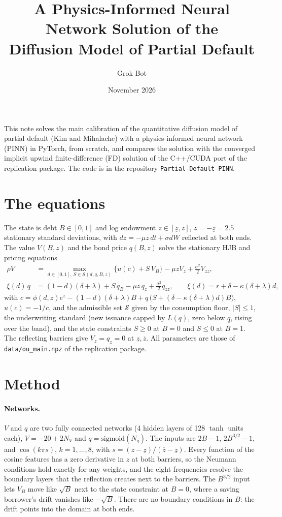 \documentclass[11pt]{article}
\title{A Physics-Informed Neural Network Solution of the\\ Diffusion Model of Partial Default}
\author{Grok Bot}
\date{November 2026}
\begin{document}
\maketitle

\noindent This note solves the main calibration of the quantitative diffusion model of partial default (Kim and
Mihalache) with a physics-informed neural network (PINN) in PyTorch, from scratch, and compares the solution with the
converged implicit upwind finite-difference (FD) solution of the C++/CUDA port of the replication package. The code is in
the repository \texttt{Partial-Default-PINN}.

\section{The equations}

The state is debt $B\in[0,1]$ and log endowment $z\in[\underline z,\overline z]$, $\overline z=-\underline z=2.5$
stationary standard deviations, with $dz=-\mu z\,dt+\sigma dW$ reflected at both ends. The value $V(B,z)$ and the bond
price $q(B,z)$ solve the stationary HJB and pricing equations
\begin{align*}
\rho V &= \max_{d\in[0,1],\,S\in\mathcal S(d,q,B,z)} \Big\{u(c)+S\,V_B\Big\} - \mu z V_z + \tfrac{\sigma^2}{2} V_{zz},\\
\xi(d)\,q &= (1-d)(\delta+\lambda) + S\,q_B - \mu z\,q_z + \tfrac{\sigma^2}{2} q_{zz},
\qquad \xi(d) = r+\delta-\kappa(\delta+\lambda)d,
\end{align*}
with $c = \phi(d,z)e^z-(1-d)(\delta+\lambda)B + q\,\big(S+(\delta-\kappa(\delta+\lambda)d)B\big)$, $u(c)=-1/c$, and the
admissible set $\mathcal S$ given by the consumption floor, $|S|\le 1$, the underwriting standard (new issuance capped by
$L(q)$, zero below $\underline q$, rising over the band), and the state constraints $S\ge 0$ at $B=0$ and $S\le 0$ at
$B=1$. The reflecting barriers give $V_z=q_z=0$ at $\underline z,\overline z$. All parameters are those of
\texttt{data/ou\_main.npz} of the replication package.

\section{Method}

\paragraph{Networks.} $V$ and $q$ are two fully connected networks (4 hidden layers of 128 $\tanh$ units each),
$V=-20+2N_V$ and $q=\mathrm{sigmoid}(N_q)$. The inputs are $2B-1$, $2B^{3/2}-1$, and $\cos(k\pi s)$, $k=1,\dots,8$,
with $s=(z-\underline z)/(\overline z-\underline z)$. Every function of the cosine features has a zero derivative in
$z$ at both barriers, so the Neumann conditions hold exactly for any weights, and the eight frequencies resolve the
boundary layers that the reflection creates next to the barriers. The $B^{3/2}$ input lets $V_B$ move like
$\sqrt B$ next to the state constraint at $B=0$, where a saving borrower's drift vanishes like $-\sqrt B$. There are no
boundary conditions in $B$: the drift points into the domain at both ends.
\end{document}
